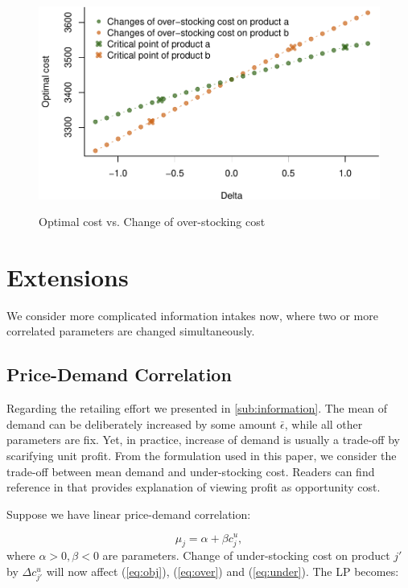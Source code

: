 \documentclass[a4paper,11pt]{article}
\begin{document}
\begin{figure}[ht]
\centering
\caption{Optimal cost vs. Change of over-stocking cost}
\includegraphics{Example-figure_files/figure-latex/c_o-1.pdf}
\label{fig:over}
\end{figure}

\section{Extensions}
\label{se:extensions}

We consider more complicated information intakes now, where two or more correlated parameters are changed simultaneously.

\subsection{Price-Demand Correlation}
Regarding the retailing effort we presented in \ref{sub:information}. The mean of demand can be deliberately increased by some amount $\bar{\epsilon}$, while all other parameters are fix. Yet, in practice, increase of demand is usually a trade-off by scarifying unit profit. From the formulation used in this paper, we consider the trade-off between mean demand and under-stocking cost. Readers can find reference in \cite{Ch12,Po02,SPP98} that provides explanation of viewing profit as opportunity cost.

Suppose we have linear price-demand correlation:

\[
    \mu_j = \alpha + \beta c_j^u,
\]
where $\alpha > 0, \beta < 0$ are parameters. Change of under-stocking cost on product $j'$ by $\Delta c_{j'}^u$ will now affect (\ref{eq:obj}), (\ref{eq:over}) and (\ref{eq:under}). The LP becomes:
\end{document}
